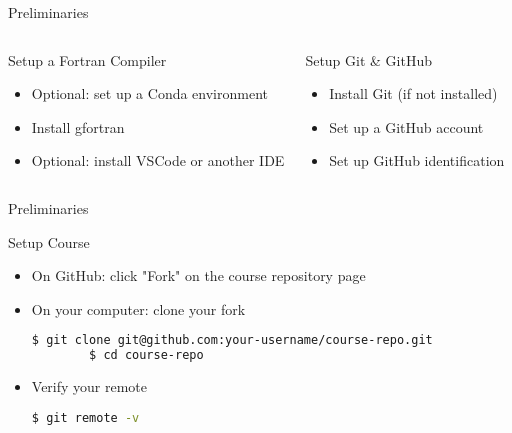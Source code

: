 \begin{frame}{Preliminaries}
	\begin{columns}[T]
		\begin{block}{Setup a Fortran Compiler}
			\begin{itemize}
				\item Optional: set up a Conda environment
				\item Install gfortran
				\item Optional: install VSCode or another IDE
			\end{itemize}
		\end{block}		
		\begin{block}{Setup Git \& GitHub}
			\begin{itemize}
				\item Install Git (if not installed)
				\item Set up a GitHub account
				\item Set up GitHub identification
			\end{itemize}
		\end{block}		
	\end{columns}
\end{frame}


\begin{frame}[fragile]{Preliminaries}
	\begin{block}{Setup Course}
	\begin{itemize}
	 \item On GitHub: click "Fork" on the course repository page
	 \item On your computer: clone your fork
		\begin{lstlisting}[language=bash]
		$ git clone git@github.com:your-username/course-repo.git
		$ cd course-repo
		\end{lstlisting}
	\item Verify your remote
		\begin{lstlisting}[language=bash]
		$ git remote -v
		\end{lstlisting}
	\end{itemize}
	\end{block}
\end{frame}



